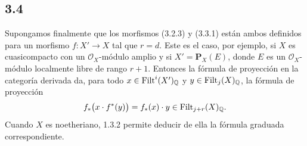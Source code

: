 \subsection*{3.4}
Supongamos finalmente que los morfismos (3.2.3) y (3.3.1) están ambos
definidos para un morfismo \(f:X'\to X\) tal que \(r=d\). Este es el caso,
por ejemplo, si \(X\) es cuasicompacto con un \(\mathcal O_X\)-módulo amplio
y si \(X'=\mathbf P_X(E)\), donde \(E\) es un \(\mathcal O_X\)-módulo
localmente libre de rango \(r+1\). Entonces la fórmula de proyección en la
categoría derivada da, para todo \(x\in\operatorname{Filt}^i(X')_{\mathbb Q}\) y
\(y\in\operatorname{Filt}_j(X)_{\mathbb Q}\), la fórmula de proyección
\[
 f_*\bigl(x\cdot f^*(y)\bigr)=f_*(x)\cdot y\in\operatorname{Filt}_{j+r}(X)_{\mathbb Q}.
\]
Cuando \(X\) es noetheriano, 1.3.2 permite deducir de ella la fórmula
graduada correspondiente.
